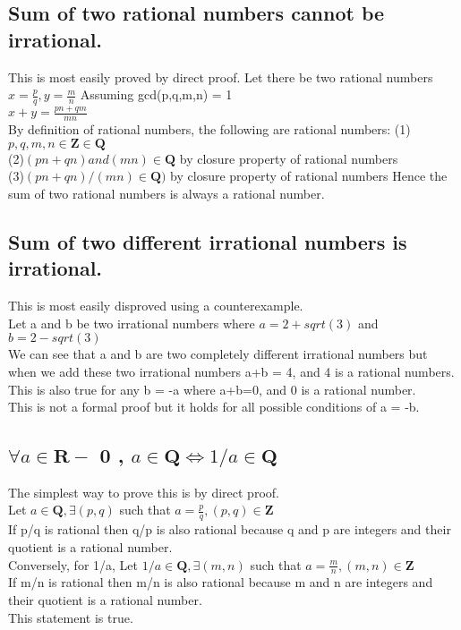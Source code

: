 \documentclass{article}
\begin{document}
\subsection{Sum of two rational numbers cannot be irrational.}
\Large This is most easily proved by direct proof.
Let there be two rational numbers $ x = \frac{p}{q}, y = \frac{m}{n}$
Assuming gcd(p,q,m,n) = 1 \\
\Large $x + y = \frac{pn + qm}{mn}$
\\
\Large By definition of rational numbers, the following are rational numbers:
(1)$p,q,m,n \in \mathbf{Z} \in \mathbf{Q}$\\
(2)$(pn + qn) and (mn) \in \mathbf{Q} $ by closure property of rational numbers\\
(3)$(pn+qn)/(mn) \in \mathbf{Q})$ by closure property of rational numbers
Hence the sum of two rational numbers is always a rational number.\\

\subsection{Sum of two different irrational numbers is irrational.}
\Large This is most easily disproved using a counterexample. \\
Let a and b be two irrational numbers where $a = 2+sqrt(3)$ and $b = 2-sqrt(3)$\\
We can see that a and b are two completely different irrational numbers but when we add these two irrational numbers a+b = 4, and 4 is a rational numbers. This is also true for any b = -a where a+b=0, and 0 is a rational number.\\
This is not a formal proof but it holds for all possible conditions of a = -b.
\\
\subsection{$\forall a \in \mathbf{R} - $ {0} , $a \in \mathbf{Q} \iff 1/a \in \mathbf{Q}$}


\Large The simplest way to prove this is by direct proof.
\\
\Large Let $a \in \mathbf{Q} , \exists (p,q)$ such that $a = \frac{p}{q},(p,q) \in \mathbf{Z}$\\
If p/q is rational then q/p is also rational because q and p are integers and their quotient is a rational number.\\
\Large Conversely, for 1/a, Let $1/a \in \mathbf{Q} , \exists (m,n)$ such that $a = \frac{m}{n},(m,n) \in \mathbf{Z}$\\
If m/n is rational then m/n is also rational because m and n are integers and their quotient is a rational number.\\
This statement is true.\\
\end{document}
